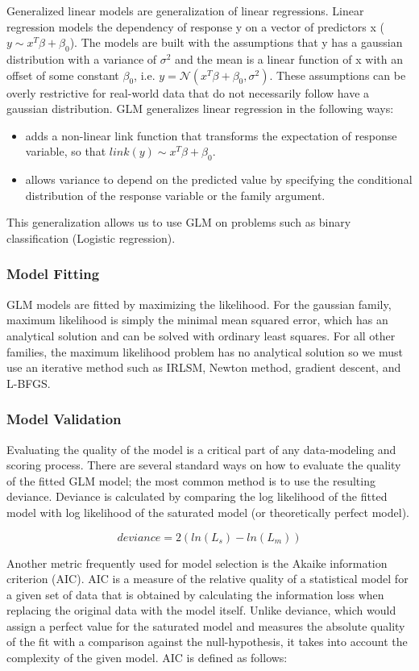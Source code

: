 \documentclass[11pt]{article}
\begin{document}
Generalized linear models are generalization of linear regressions. Linear regression models the dependency of response y on a vector of predictors x ($y \sim x^T \beta + \beta_0$). The models are built with the assumptions that y has a gaussian distribution with a variance of $\sigma^2$ and the mean is a linear function of x with an offset of some constant $\beta_0$, i.e. $ y = \mathcal{N}(x^T \beta + \beta_0 ,  \sigma^2) $. These assumptions can be overly restrictive for real-world data that do not necessarily follow have a gaussian distribution. GLM generalizes linear regression in the following ways: 
\begin{itemize} 
\item adds a non-linear link function that transforms the expectation of response variable, so that $link(y) \sim x^T \beta + \beta_0$.
\item allows variance to depend on the predicted value by specifying the conditional distribution of the response variable or the family argument.

\end{itemize}
This generalization allows us to use GLM on problems such as binary classification (Logistic regression).

\subsubsection{Model Fitting}
GLM models are fitted by maximizing the likelihood. For the gaussian family, maximum likelihood is simply the minimal mean squared error, which has an analytical solution and can be solved with ordinary least squares. For all other families, the maximum likelihood problem has no analytical solution so we must use an iterative method such as IRLSM, Newton method, gradient descent, and L-BFGS.
\subsubsection{Model Validation}
Evaluating the quality of the model is a critical part of any data-modeling and scoring process. There are several standard ways on how to evaluate the quality of the fitted GLM model; the most common method is to use the resulting deviance. Deviance is calculated by comparing the log likelihood of the fitted model with log likelihood of the saturated model (or theoretically perfect model).

\[ deviance = 2({ln(L_{s})} - {ln(L_{m})}) \]

Another metric frequently used for model selection is the Akaike information criterion (AIC). AIC is a measure of the relative quality of a statistical model for a given set of data that is obtained by calculating the information loss when replacing the original data with the model itself. Unlike deviance, which would assign a perfect value for the saturated model and measures the absolute quality of the fit with a comparison against the null-hypothesis, it takes into account the complexity of the given model. AIC is defined as follows:
\end{document}
